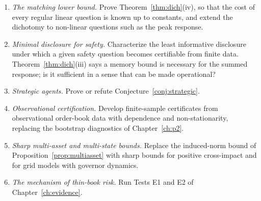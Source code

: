 \begin{enumerate}
\item \emph{The matching lower bound.} Prove Theorem~\ref{thm:dich}(iv), so that the cost of every regular linear question is known up to constants, and extend the dichotomy to non-linear questions such as the peak response.
\item \emph{Minimal disclosure for safety.} Characterize the least informative disclosure under which a given safety question becomes certifiable from finite data. Theorem~\ref{thm:dich}(iii) says a memory bound is necessary for the summed response; is it sufficient in a sense that can be made operational?
\item \emph{Strategic agents.} Prove or refute Conjecture~\ref{conj:strategic}.
\item \emph{Observational certification.} Develop finite-sample certificates from observational order-book data with dependence and non-stationarity, replacing the bootstrap diagnostics of Chapter~\ref{ch:p2}.
\item \emph{Sharp multi-asset and multi-state bounds.} Replace the induced-norm bound of Proposition~\ref{prop:multiasset} with sharp bounds for positive cross-impact and for grid models with governor dynamics.
\item \emph{The mechanism of thin-book risk.} Run Tests E1 and E2 of Chapter~\ref{ch:evidence}.
\end{enumerate}
